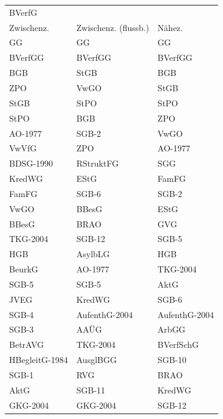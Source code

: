 \begin{tabular}{lll}
\toprule
\multicolumn{4}{l}{BVerfG} \\
    Zwischenz. & Zwischenz. (flussb.) &        Nähez. \\
\midrule
            GG &                   GG &            GG \\
       BVerfGG &              BVerfGG &       BVerfGG \\
           BGB &                 StGB &           BGB \\
           ZPO &                 VwGO &          StGB \\
          StGB &                 StPO &          StPO \\
          StPO &                  BGB &           ZPO \\
       AO-1977 &                SGB-2 &          VwGO \\
         VwVfG &                  ZPO &       AO-1977 \\
     BDSG-1990 &            RStruktFG &           SGG \\
        KredWG &                 EStG &         FamFG \\
         FamFG &                SGB-6 &         SGB-2 \\
          VwGO &                BBesG &          EStG \\
         BBesG &                 BRAO &           GVG \\
      TKG-2004 &               SGB-12 &         SGB-5 \\
           HGB &              AsylbLG &           HGB \\
        BeurkG &              AO-1977 &      TKG-2004 \\
         SGB-5 &                SGB-5 &          AktG \\
          JVEG &               KredWG &         SGB-6 \\
         SGB-4 &        AufenthG-2004 & AufenthG-2004 \\
         SGB-3 &                 AAÜG &         ArbGG \\
       BetrAVG &             TKG-2004 &     BVerfSchG \\
HBegleitG-1984 &             AusglBGG &        SGB-10 \\
         SGB-1 &                  RVG &          BRAO \\
          AktG &               SGB-11 &        KredWG \\
      GKG-2004 &             GKG-2004 &        SGB-12 \\
\bottomrule
\end{tabular}

